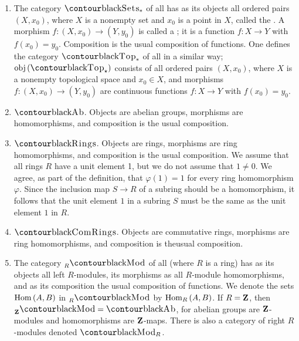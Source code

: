 \begin{example}
\begin{enumerate}[label = (\arabic*)]
            \item The category $\cSets_\ast$ of all  has as its objects all ordered pairs $(X,x_0)$, where $X$ is a nonempty set and $x_0$ is a point in $X$, called the . A morphism $f:(X,x_0) \rightarrow (Y,y_0)$ is called a ; it is a function $f:X \rightarrow Y$ with $f(x_0)=y_0$. Composition is the usual composition of functions. One defines the category $\cTop_\ast$ of all  in a similar way; $\obj{(\cTop_\star)}$ consists of all ordered pairs $(X,x_0)$, where $X$ is a nonempty topological space and $x_0 \in X$, and morphisms $f: (X,x_0) \rightarrow (Y,y_0)$ are continuous functions $f:X \rightarrow Y$ with $f(x_0) = y_0$.

            \item $\cAb$. Objects are abelian groups, morphisms are homomorphisms, and composition is the usual composition.

            \item $\cRings$. Objects are rings, morphisms are ring homomorphisms, and composition is the usual composition. We assume that all rings $R$ have a unit element 1, but we do not assume that $1 \neq 0$. We agree, as part of the definition, that $\varphi(1)=1$ for every ring homomorphism $\varphi$. Since the inclusion map $S \rightarrow R$ of a subring should be a homomorphism, it follows that the unit element $1$ in a subring $S$ must be the same as the unit element $1$ in $R$.

            \item $\cComRings$. Objects are commutative rings, morphisms are ring homomorphisms, and composition is theusual composition.

            \item The category $\prescript{}{R}\cMod$ of all  (where $R$ is a ring) has as its objects all left $R$-modules, its morphisms as all $R$-module homomorphisms, and as its composition the usual composition of functions. We denote the sets $\operatorname{Hom}{(A,B)}$ in $\prescript{}{R}\cMod$ by $\operatorname{Hom}_R{(A,B)}$. If $R=\mathbf{Z}$, then $\prescript{}{\bfZ}\cMod = \cAb$, for abelian groups are $\mathbf{Z}$-modules and homomorphisms are $\mathbf{Z}$-maps. There is also a category of right $R$-modules denoted $\cMod_R$.
        \end{enumerate}
    \end{example}

